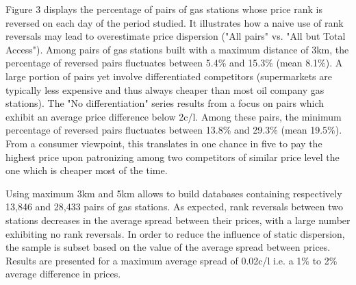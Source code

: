 \documentclass[11pt]{article}
\begin{document}
Figure 3 displays the percentage of pairs of gas stations whose price rank is reversed on each day of the period studied. It illustrates how a naive use of rank reversals may lead to overestimate price dispersion ("All pairs" vs. "All but Total Access"). Among pairs of gas stations built with a maximum distance of 3km, the percentage of reversed pairs fluctuates between 5.4\% and 15.3\%  (mean 8.1\%). A large portion of pairs yet involve differentiated competitors (supermarkets are typically less expensive and thus always cheaper than most oil company gas stations). The "No differentiation" series results from a focus on pairs which exhibit an average price difference below 2c/l. Among these pairs, the minimum percentage of reversed pairs fluctuates between 13.8\% and 29.3\% (mean 19.5\%). From a consumer viewpoint, this translates in one chance in five to pay the highest price upon patronizing among two competitors of similar price level the one which is cheaper most of the time.

Using maximum 3km and 5km allows to build databases containing respectively 13,846 and 28,433 pairs of gas stations. As expected, rank reversals between two stations decreases in the average spread between their prices, with a large number exhibiting no rank reversals. In order to reduce the influence of static dispersion, the sample is subset based on the value of the average spread between prices. Results are presented for a maximum average spread of 0.02c/l i.e. a 1\% to 2\% average difference in prices.
\end{document}
